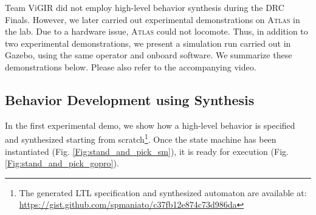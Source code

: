 
Team ViGIR did not employ high-level behavior synthesis during the DRC Finals.
However, we later carried out experimental demonstrations on \textsc{Atlas} in the lab.
Due to a hardware issue, \textsc{Atlas} could not locomote.
Thus, in addition to two experimental demonstrations, we present a simulation run carried out in Gazebo, using the same operator and onboard software.
We summarize these demonstrations below.
Please also refer to the accompanying video.

\subsection{Behavior Development using Synthesis}

In the first experimental demo, we show how a high-level behavior is specified and synthesized starting from scratch\footnote{The generated LTL specification and synthesized automaton are available at: \scriptsize{\url{https://gist.github.com/spmaniato/c37fb12e874c73d986da}}}.
Once the state machine has been instantiated (Fig. \ref{Fig:stand_and_pick_sm}), it is ready for execution (Fig. \ref{Fig:stand_and_pick_gopro}).

